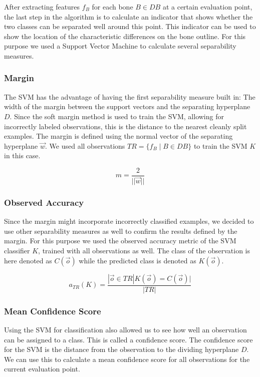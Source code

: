 \documentclass[pdftex,12pt,a4paper]{report}
\begin{document}
After extracting features $f_B$ for each bone $B \in DB$ at a certain evaluation point, the last step in the
algorithm is to calculate an indicator that shows whether the two classes can be separated well around this point.
This indicator can be used to show the location of the characteristic differences on the bone outline. For this
purpose we used a Support Vector Machine to calculate several separability measures.

\subsubsection{Margin}

The SVM has the advantage of having the first separability measure built in: The width of the margin between the
support vectors and the separating hyperplane $D$. Since the soft margin method is used to train the SVM, allowing for incorrectly labeled observations, this is the distance to the nearest cleanly split examples. The margin is 
defined using the normal vector of the separating hyperplane $\vec{w}$. We used all observations $TR = \{ f_B \mid B \in DB \}$ to train the SVM $K$ in this case.

\begin{equation}
m = \frac{2}{||\vec{w}||}
\end{equation}

\subsubsection{Observed Accuracy}

Since the margin might incorporate incorrectly classified examples, we decided to use other separability measures
as well to confirm the results defined by the margin. For this purpose we used the observed accuracy metric of the SVM classifier $K$, trained with all observations as well. The class of the observation is here denoted as $C(\vec{o})$
while the predicted class is denoted as $K(\vec{o})$.

\begin{equation}
a_{TR}(K) = \frac{|\vec{o} \in TR | K(\vec{o}) = C(\vec{o})|}{|TR|}
\end{equation}

\subsubsection{Mean Confidence Score}
\label{subsub:mean-confidence-score}

Using the SVM for classification also allowed us to see how well an observation can be assigned to a class. This
is called a confidence score. The confidence score for the SVM is the distance from the observation to the dividing
hyperplane $D$. We can use this to calculate a mean confidence score for all observations for the current evaluation point.
\end{document}
